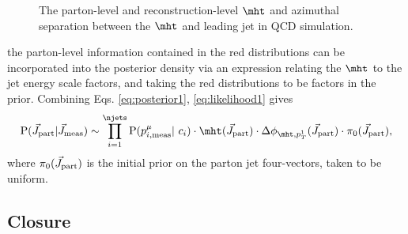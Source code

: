 \begin{figure}[h]
\centering
{}
\caption{The parton-level and reconstruction-level $\mht$ and azimuthal separation between the $\mht$ and leading jet in QCD simulation.}
\label{fig:Mht}
\end{figure}
the parton-level information contained in the red distributions can be incorporated into the posterior density via an expression relating the $\mht$ to the jet energy scale factors, and taking the red distributions to be factors in the prior. Combining Eqs. \ref{eq:posterior1}, \ref{eq:likelihood1} gives
\begin{equation}
{\rm P}(\vec{J}_{\rm part}|\vec{J}_{\rm meas}) \sim
\prod_{i=1}^{\njets}{\rm P}(p^{\mu}_{i,\rm meas}|\ c_{i})\cdot \mht(\vec{J}_{\rm part})\cdot \Delta\phi_{\mht,p_{T}^1}(\vec{J}_{\rm part})\cdot \pi_0(\vec{J}_{\rm part}),
\end{equation}
where $\pi_0(\vec{J}_{\rm part})$ is the initial prior on the parton jet four-vectors, taken to be uniform.


\subsection{Closure}

